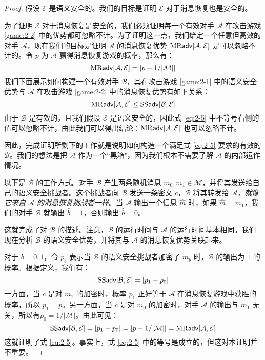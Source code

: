 \begin{proof}
假设 $\mathcal{E}$ 是语义安全的。我们的目标是证明 $\mathcal{E}$ 对于消息恢复也是安全的。

为了证明 $\mathcal{E}$ 对于消息恢复是安全的，我们必须证明每一个有效对手 $\mathcal{A}$ 在攻击游戏 \ref{game:2-2} 中的优势都可忽略不计。为了证明这一点，我们给定一个任意但高效的对手 $\mathcal{A}$，现在我们的目标是证明 $\mathcal{A}$ 的消息恢复优势 ${\rm MR\mathsf{adv}}[\mathcal{A},\mathcal{E}]$ 是可以忽略不计的。令 $p$ 为 $\mathcal{A}$ 赢得消息恢复游戏的概率，那么有：
\[
{\rm MR\mathsf{adv}}[\mathcal{A},\mathcal{E}]=\left|p-{1}/{|\mathcal{M}|}\right|
\]
我们下面展示如何构建一个有效对手 $\mathcal{B}$，其在攻击游戏 \ref{game:2-1} 中的语义安全优势与 $\mathcal{A}$ 在攻击游戏 \ref{game:2-2} 中的消息恢复优势有如下关系：
\begin{equation}\label{eq:2-5}
{\rm MR\mathsf{adv}}[\mathcal{A},\mathcal{E}]\leq{\rm SS\mathsf{adv}}[\mathcal{B},\mathcal{E}]
\end{equation}
由于 $\mathcal{B}$ 是有效的，且我们假设 $\mathcal{E}$ 是语义安全的，因此式 \ref{eq:2-5} 中不等号右侧的值可以忽略不计，由此我们可以得出结论：${\rm MR\mathsf{adv}}[\mathcal{A},\mathcal{E}]$ 也可以忽略不计。

因此，完成证明所剩下的工作就是说明如何构造一个满足式 \ref{eq:2-5} 要求的有效的 $\mathcal{B}$。我们的想法是把 $\mathcal{A}$ 作为一个``黑箱"，因为我们根本不需要了解 $\mathcal{A}$ 的内部运作情况。

以下是 $\mathcal{B}$ 的工作方式。对手 $\mathcal{B}$ 产生两条随机消息 $m_0,m_1\in\mathcal{M}$，并将其发送给自己的语义安全挑战者。这个挑战者向 $\mathcal{B}$ 发送一条密文 $c$，$\mathcal{B}$ 将其转发给 $\mathcal{A}$，\emph{就像它来自 $\mathcal{A}$ 的消息恢复挑战者一样}。当 $\mathcal{A}$ 输出一个信息 $\hat m$ 时，如果 $\hat m=m_1$，我们的对手 $\mathcal{B}$ 就输出 $\hat b=1$，否则输出 $\hat b=0$。

这就完成了对 $\mathcal{B}$ 的描述。注意，$\mathcal{B}$ 的运行时间与 $\mathcal{A}$ 的运行时间基本相同。我们现在分析 $\mathcal{B}$ 的语义安全优势，并将其与 $\mathcal{A}$ 的消息恢复优势关联起来。

对于 $b=0,1$，令 $p_b$ 表示当 $\mathcal{B}$ 的语义安全挑战者加密了 $m_b$ 时，$\mathcal{B}$ 的输出为 $1$ 的概率。根据定义，我们有：
\[
{\rm SS\mathsf{adv}}[\mathcal{B},\mathcal{E}]=|p_1-p_0|
\]
一方面，当 $c$ 是对 $m_1$ 的加密时，概率 $p_1$ 正好等于 $\mathcal{A}$ 在消息恢复游戏中获胜的概率，所以 $p_1=p$。另一方面，当 $c$ 是对 $m_0$ 的加密时，对手 $\mathcal{A}$ 的输出与 $m_1$ 无关，所以有$p_0={1}/{|\mathcal M|}$。由此可见：
\[
{\rm SS\mathsf{adv}}[\mathcal{B},\mathcal{E}]=|p_1-p_0|=|p-{1}/{|\mathcal{M}|}|={\rm MR\mathsf{adv}}[\mathcal{A},\mathcal{E}]
\]
这就证明了式 \ref{eq:2-5}。事实上，式 \ref{eq:2-5} 中的等号是成立的，但这对本证明并不重要。
\end{proof}

